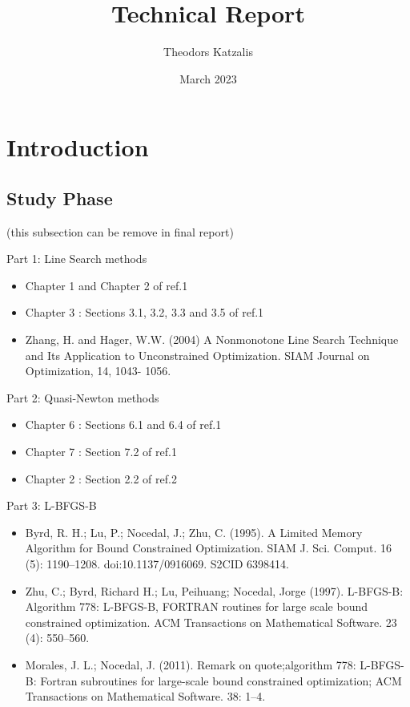 \documentclass[a4paper,11pt]{article}
\title{Technical Report}
\author{Theodors Katzalis}
\date{March 2023}
\numberwithin{equation}{section} %
\begin{document}
\maketitle

\tableofcontents
\newpage

\section{Introduction}
\label{intro}

\subsection{Study Phase} (this subsection can be remove in final report)

Part 1: Line Search methods

\begin{itemize}
\item Chapter 1 and Chapter 2 of ref.1
\item Chapter 3 : Sections 3.1, 3.2, 3.3 and 3.5 of ref.1
\item Zhang, H. and Hager, W.W. (2004) A Nonmonotone Line Search Technique and Its Application to Unconstrained Optimization. SIAM Journal on Optimization, 14, 1043-
1056.
\end{itemize}

Part 2: Quasi-Newton methods
\begin{itemize}
\item Chapter 6 : Sections 6.1 and 6.4 of ref.1
\item Chapter 7 : Section 7.2 of ref.1
\item Chapter 2 : Section 2.2 of ref.2
\end{itemize}

Part 3: L-BFGS-B
\begin{itemize}

\item Byrd, R. H.; Lu, P.; Nocedal, J.; Zhu, C. (1995). A Limited Memory Algorithm for
Bound Constrained Optimization. SIAM J. Sci. Comput. 16 (5): 1190–1208.
doi:10.1137/0916069. S2CID 6398414.

\item Zhu, C.; Byrd, Richard H.; Lu, Peihuang; Nocedal, Jorge (1997). L-BFGS-B: Algorithm 778: L-BFGS-B, FORTRAN routines for large scale bound constrained optimization. ACM Transactions on Mathematical Software. 23 (4): 550–560.

\item Morales, J. L.; Nocedal, J. (2011). Remark on quote;algorithm 778: L-BFGS-B: 
Fortran subroutines for large-scale bound constrained optimization; ACM Transactions on Mathematical Software. 38: 1–4.

\end{itemize}
\end{document}

